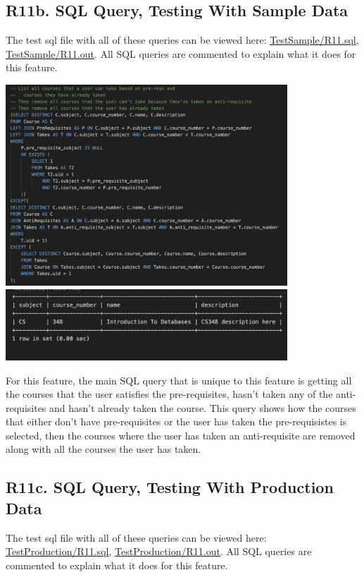 \documentclass[12pt, a4paper]{article}
\begin{document}
\subsection*{R11b. SQL Query, Testing With Sample Data}
The test sql file with all of these queries can be viewed here: \underline{\href{https://github.com/Kggupta/DegreeMap/tree/main/Database/Queries/TestSample}{TestSample/R11.sql}}, \underline{\href{https://github.com/Kggupta/DegreeMap/tree/main/Database/Queries/TestSample}{TestSample/R11.out}}. All SQL queries are commented to explain what it does for this feature.
\begin{center}
    \includegraphics[width=400px]{R11/q1}
    \includegraphics[width=400px]{R11/q1out}
\end{center}
For this feature, the main SQL query that is unique to this feature is getting all the courses that the user satisfies the pre-requisites, hasn't taken any of the anti-requisites and hasn't already taken the course. This query shows how the courses that either don't have pre-requisites or the user has taken the pre-requisistes is selected, then the courses where the user has taken an anti-requisite are removed along with all the courses the user has taken.
\subsection*{R11c. SQL Query, Testing With Production Data}
The test sql file with all of these queries can be viewed here: \underline{\href{https://github.com/Kggupta/DegreeMap/tree/main/Database/Queries/TestProduction}{TestProduction/R11.sql}}, \underline{\href{https://github.com/Kggupta/DegreeMap/tree/main/Database/Queries/TestProduction}{TestProduction/R11.out}}. All SQL queries are commented to explain what it does for this feature.
\end{document}
